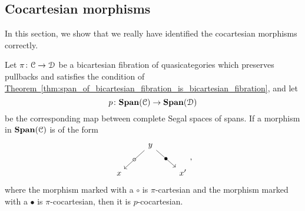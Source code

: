 \documentclass[main.tex]{subfiles}
\begin{document}
\subsection{Cocartesian morphisms}
\label{ssc:cartesian_morphisms}

In this section, we show that we really have identified the cocartesian morphisms correctly. 

\begin{proposition}
  \label{prop:form_of_cocartesian_morphisms_in_spans}
  Let $\pi\colon \mathcal{C} \to \mathcal{D}$ be a bicartesian fibration of quasicategories which preserves pullbacks and satisfies the condition of \hyperref[thm:span_of_bicartesian_fibration_is_bicartesian_fibration]{Theorem~\ref*{thm:span_of_bicartesian_fibration_is_bicartesian_fibration}}, and let
  \begin{equation*}
    p\colon \mathbf{Span}(\mathcal{C}) \to \mathbf{Span}(\mathcal{D})
  \end{equation*}
  be the corresponding map between complete Segal spaces of spans. If a morphism in $\mathbf{Span}(\mathcal{C})$ is of the form
  \begin{equation*}
    \label{eq:form_of_p_cocartesian_morphisms}
    \begin{tikzcd}
      & y
      \arrow[dl, "\circ" marking]
      \arrow[dr, "\bullet" marking]
      \\
      x
      && x'
    \end{tikzcd},
  \end{equation*}
  where the morphism marked with a $\circ$ is $\pi$-cartesian and the morphism marked with a $\bullet$ is $\pi$-cocartesian, then it is $p$-cocartesian.
\end{proposition}
\end{document}

